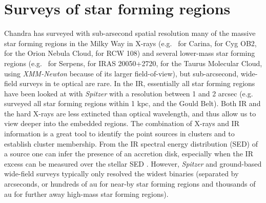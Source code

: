\documentclass[12pt]{article}
\begin{document}
\section{Surveys of star forming regions}
Chandra has surveyed with sub-arsecond spatial resolution  many of the massive star forming regions in the Milky Way
in X-rays (e.g.\ \citealt{2011ApJS..194....1T} for Carina,
\citealt{2010ApJ...713..871W} for Cyg OB2, \citealt{2005ApJS..160..379F} for
the Orion Nebula Cloud, \citealt{2008AJ....135..693W} for RCW 108) and 
several lower-mass star forming regions
(e.g.\ \citealt{2018AJ....155..241W} for Serpens, \citealt{2012AJ....144..101G}
for IRAS 20050+2720, \citealt{2007A&A...468..353G} for the Taurus Molecular
Cloud, using \emph{XMM-Newton} because of its larger field-of-view), but sub-arcsecond, wide-field surveys in te optical are rare.
In the IR, essentially
all star forming regions have been looked at with \emph{Spitzer} with a resolution between 1 and 2 arcsec
(e.g.\ \citealt{2009ApJS..184...18G} surveyed all star forming regions within 1
kpc, and \citealt{2015ApJS..220...11D} the Gould Belt). Both IR and the hard
X-rays are less extincted than optical wavelength, and thus allow us to view
deeper into the embedded regions. The combination of X-rays and IR information
is a great tool to identify the point sources in clusters and to establish
cluster membership. From the IR spectral energy distribution (SED) of a source one can
infer the presence of an accretion disk, especially when the IR excess can be measured over the stellar SED \citep{2009ApJS..184...18G}. However, \emph{Spitzer} and ground-based wide-field surveys typically only resolved the widest binaries (separated by arcseconds, or hundreds of au for near-by star forming regions and thousands of au for further away high-mass star forming regions).
\end{document}
